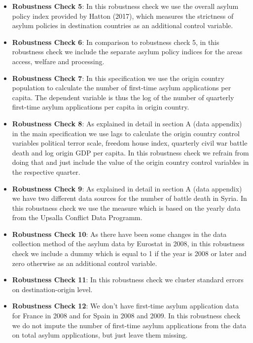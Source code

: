 \documentclass[11pt,a4paper]{scrartcl}
\begin{document}
\begin{itemize}
	\item \textbf{Robustness Check 5}: In this robustness check we use the overall asylum policy index provided by Hatton (2017), which measures the strictness of asylum policies in destination countries as an additional control variable.
	
	\item \textbf{Robustness Check 6}: In comparison to robustness check 5, in this robustness check we include the separate asylum policy indices for the areas access, welfare and processing. 
	
	\item \textbf{Robustness Check 7}: In this specification we use the origin country population to calculate the number of first-time asylum applications per capita. The dependent variable is thus the log of the number of quarterly first-time asylum applications per capita in origin country.  
	
	\item \textbf{Robustness Check 8}: As explained in detail in section A (data appendix) in the main specification we use lags to calculate the origin country control variables political terror scale, freedom house index, quarterly civil war battle death and log origin GDP per capita. In this robustness check we refrain from doing that and just include the value of the origin country control variables in the respective quarter.
	
	\item \textbf{Robustness Check 9}: As explained in detail in section A (data appendix) we have two different data sources for the number of battle death in Syria. In this robustness check we use the measure which is based on the yearly data from the Upsalla Conflict Data Programm.
	
	\item \textbf{Robustness Check 10}: As there have been some changes in the data collection method of the asylum data by Eurostat in 2008, in this robustness check we include a dummy which is equal to 1 if the year is 2008 or later and zero otherwise as an additional control variable. 
	
	\item \textbf{Robustness Check 11}: In this robustness check we cluster standard errors on destination-origin level. 
	
	\item \textbf{Robustness Check 12}: We don't have first-time asylum application data for France in 2008 and for Spain in 2008 and 2009. In this robustness check we do not impute the number of first-time asylum applications from the data on total asylum applications, but just leave them missing.   
	

\end{itemize}
\end{document}
